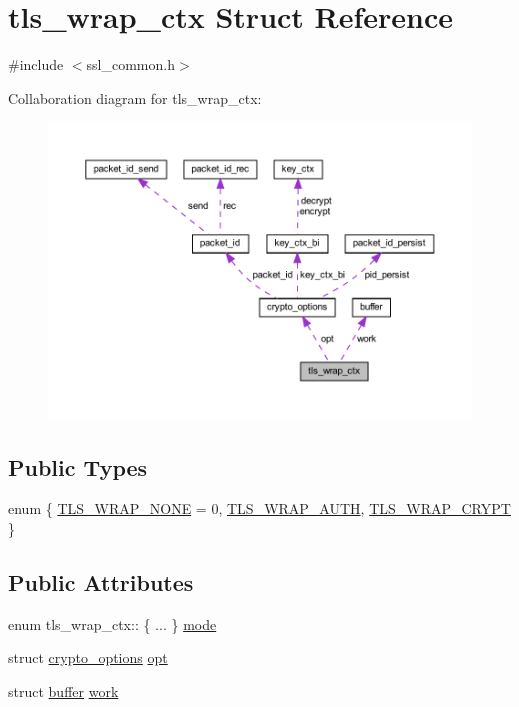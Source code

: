 \hypertarget{structtls__wrap__ctx}{}\section{tls\+\_\+wrap\+\_\+ctx Struct Reference}
\label{structtls__wrap__ctx}


{\ttfamily \#include $<$ssl\+\_\+common.\+h$>$}



Collaboration diagram for tls\+\_\+wrap\+\_\+ctx\+:
\nopagebreak
\begin{figure}[H]
\begin{center}
\leavevmode
\includegraphics[width=350pt]{structtls__wrap__ctx__coll__graph}
\end{center}
\end{figure}
\subsection*{Public Types}
\begin{DoxyCompactItemize}
\item 
enum \{ \hyperlink{structtls__wrap__ctx_a208cb4dc29cba3a00bb6a898eae2403ea7c681db449b599faa6757c538f32fcee}{T\+L\+S\+\_\+\+W\+R\+A\+P\+\_\+\+N\+O\+N\+E} = 0, 
\hyperlink{structtls__wrap__ctx_a208cb4dc29cba3a00bb6a898eae2403ead22a5947e6b2fa7f8e5cac9bf2703a18}{T\+L\+S\+\_\+\+W\+R\+A\+P\+\_\+\+A\+U\+T\+H}, 
\hyperlink{structtls__wrap__ctx_a208cb4dc29cba3a00bb6a898eae2403ea54693b0aabdf162f098f390a6646040b}{T\+L\+S\+\_\+\+W\+R\+A\+P\+\_\+\+C\+R\+Y\+P\+T}
 \}
\end{DoxyCompactItemize}
\subsection*{Public Attributes}
\begin{DoxyCompactItemize}
\item 
enum tls\+\_\+wrap\+\_\+ctx\+:: \{ ... \}  \hyperlink{structtls__wrap__ctx_a7d6bdbb4efeaa095e3ee138e490f684e}{mode}
\item 
struct \hyperlink{structcrypto__options}{crypto\+\_\+options} \hyperlink{structtls__wrap__ctx_a610411b7046f8b43a47cc92c0ef9bd6d}{opt}
\item 
struct \hyperlink{structbuffer}{buffer} \hyperlink{structtls__wrap__ctx_aabfcb82396ee2810549bcc8fa1c43e91}{work}
\end{DoxyCompactItemize}


